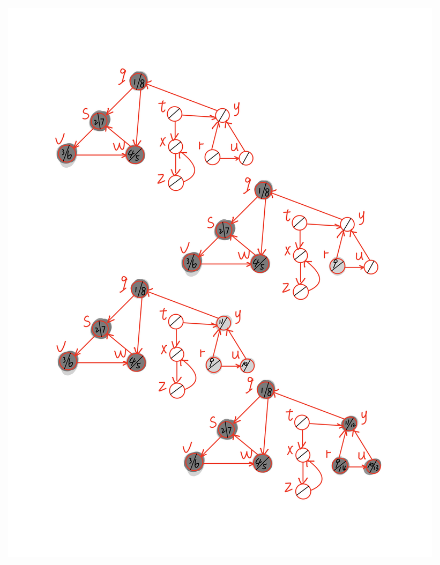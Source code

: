 \documentclass[12pt,a4paper,fontset=none]{ctexart}
\begin{document}
\begin{figure}[H]
    \centering
    \includegraphics[width=1\linewidth]{IMG_0123.PNG}
\end{figure}
\end{document}

